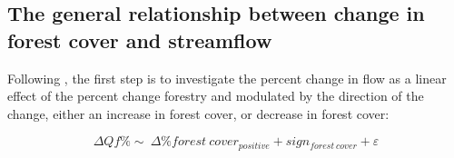 \documentclass[]{elsarticle} %
\begin{document}
\hypertarget{the-general-relationship-between-change-in-forest-cover-and-streamflow}{%
\subsection{The general relationship between change in forest cover and streamflow}\label{the-general-relationship-between-change-in-forest-cover-and-streamflow}}

Following \citet{zhang2017}, the first step is to investigate the percent change in flow as a linear effect of the percent change forestry and modulated by the direction of the change, either an increase in forest cover, or decrease in forest cover:

\begin{equation}
\Delta Qf \% \sim ~ \Delta \% forest~cover_{positive} + sign_{forest~cover} + \varepsilon \label{eq:eq3}
\end{equation}
\end{document}

